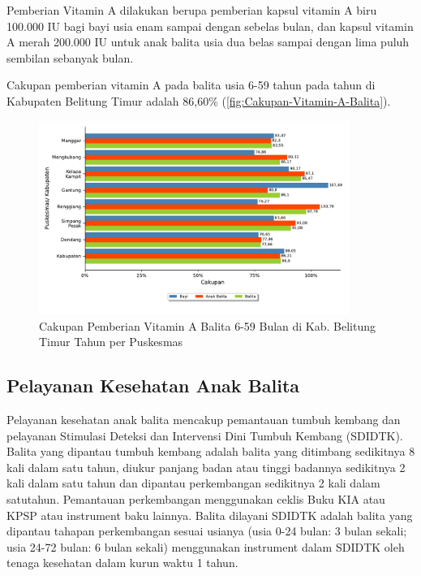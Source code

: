 Pemberian Vitamin A dilakukan berupa pemberian kapsul vitamin A biru 100.000 IU bagi bayi
usia enam sampai dengan sebelas bulan, dan kapsul vitamin A merah 200.000
IU untuk anak balita usia dua belas sampai dengan lima puluh sembilan sebanyak
bulan.

Cakupan pemberian vitamin A pada balita usia 6-59 tahun pada tahun \tP di Kabupaten Belitung Timur adalah 86,60\% (\autoref{fig:Cakupan-Vitamin-A-Balita}).

\begin{figure}[H]
    \centering
    \includegraphics[width=0.9\textwidth]{bab_05/bab_05_22_bayiBalitaVitA}
    \caption{Cakupan Pemberian Vitamin A Balita 6-59 Bulan di Kab. Belitung Timur Tahun \tP per Puskesmas}
    \label{fig:Cakupan-Vitamin-A-Balita}
\end{figure}


\subsection{Pelayanan Kesehatan Anak Balita}
Pelayanan kesehatan anak balita mencakup pemantauan tumbuh kembang dan pelayanan Stimulasi Deteksi dan Intervensi Dini Tumbuh Kembang (SDIDTK).
Balita yang dipantau tumbuh kembang adalah  balita yang ditimbang sedikitnya 8 kali dalam satu tahun, diukur panjang badan atau tinggi badannya sedikitnya 2 kali dalam satu tahun dan dipantau perkembangan sedikitnya 2 kali dalam satutahun. Pemantauan perkembangan menggunakan ceklis Buku KIA atau KPSP atau instrument baku lainnya.
Balita dilayani SDIDTK adalah balita yang dipantau tahapan perkembangan sesuai usianya (usia 0-24 bulan: 3 bulan sekali; usia 24-72 bulan: 6 bulan sekali) menggunakan instrument dalam SDIDTK oleh tenaga kesehatan dalam kurun waktu 1 tahun.

